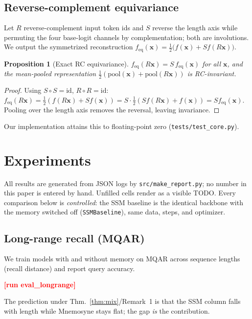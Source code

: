 \documentclass[10pt,journal]{IEEEtran}
\newtheorem{proposition}{Proposition}
\newcommand{\longrangeTable}{\textbf{\textcolor{red}{[run eval\_longrange]}}}
\begin{document}
\subsection{Reverse-complement equivariance}
Let $R$ reverse-complement input token ids and $S$ reverse the length axis while
permuting the four base-logit channels by complementation; both are involutions.
We output the symmetrized reconstruction
$f_{\mathrm{eq}}(\bm x)=\tfrac12\big(f(\bm x)+S f(R\bm x)\big)$.
\begin{proposition}[Exact RC equivariance]
\label{prop:rc}
$f_{\mathrm{eq}}(R\bm x)=S\,f_{\mathrm{eq}}(\bm x)$ for all $\bm x$, and the
mean-pooled representation $\tfrac12(\mathrm{pool}(\bm x)+\mathrm{pool}(R\bm x))$
is RC-invariant.
\end{proposition}
\begin{proof}
Using $S{\circ}S=\mathrm{id}$, $R{\circ}R=\mathrm{id}$:
$f_{\mathrm{eq}}(R\bm x)=\tfrac12(f(R\bm x)+Sf(\bm x))
=S\cdot\tfrac12(Sf(R\bm x)+f(\bm x))=Sf_{\mathrm{eq}}(\bm x)$. Pooling over the
length axis removes the reversal, leaving invariance.
\end{proof}
\noindent Our implementation attains this to floating-point zero
(\texttt{tests/test\_core.py}).

\section{Experiments}
\label{sec:exp}
All results are generated from JSON logs by \texttt{src/make\_report.py}; no
number in this paper is entered by hand. Unfilled cells render as a visible TODO.
Every comparison below is \emph{controlled}: the SSM baseline is the identical
backbone with the memory switched off (\texttt{SSMBaseline}), same data, steps,
and optimizer.

\subsection{Long-range recall (MQAR)}
We train models with and without memory on MQAR \cite{arora2023zoology} across
sequence lengths (recall distance) and report query accuracy.
\begin{table}[H]\centering\caption{MQAR query accuracy (\%) vs.\ sequence length.
Memory off (SSM) vs.\ Mnemosyne, matched backbone.}\longrangeTable{}\end{table}
The prediction under Thm.~\ref{thm:mix}/Remark~1 is that the SSM column falls with
length while Mnemosyne stays flat; the gap \emph{is} the contribution.
\end{document}
